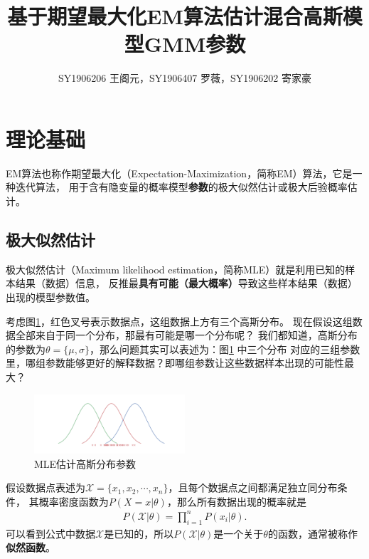 \documentclass[UTF8]{ctexart}
\begin{document}
\title{基于期望最大化EM算法估计混合高斯模型GMM参数}
\author{SY1906206 王阁元，SY1906407 罗薇，SY1906202 寄家豪}
\maketitle

\section{理论基础}

EM算法也称作期望最大化（Expectation-Maximization，简称EM）算法，它是一种迭代算法，
用于含有隐变量的概率模型\textbf{参数}的极大似然估计或极大后验概率估计。

\subsection{极大似然估计}
\label{subsection-1}

极大似然估计（Maximum likelihood estimation，简称MLE）就是利用已知的样本结果（数据）信息，
反推最\textbf{具有可能（最大概率）}导致这些样本结果（数据）出现的模型参数值。

考虑图\ref{MLE}，红色叉号表示数据点，这组数据上方有三个高斯分布。
现在假设这组数据全部来自于同一个分布，那最有可能是哪一个分布呢？
我们都知道，高斯分布的参数为$\theta=\{\mu, \sigma\}$，那么问题其实可以表述为：图\ref{MLE} 中三个分布
对应的三组参数里，哪组参数能够更好的解释数据？即哪组参数让这些数据样本出现的可能性最大？

\begin{figure}[!h]
  \includegraphics[width=0.5\textwidth]{./figures/MLE.pdf}
  \centering
  \caption{MLE估计高斯分布参数}
  \label{MLE}
\end{figure}

假设数据点表述为$\mathcal{X}=\{x_1, x_2, \cdots, x_n\}$，且每个数据点之间都满足独立同分布条件，
其概率密度函数为$P(X=x|\theta)$，那么所有数据出现的概率就是
\begin{equation}\label{Likelihood}
  \begin{split}
    P(\mathcal{X}|\theta) = \prod_{i=1}^{n}P(x_i|\theta).
  \end{split}
\end{equation}
可以看到公式中数据$\mathcal{X}$是已知的，所以$P(\mathcal{X}|\theta)$是一个关于$\theta$的函数，通常被称作\textbf{似然函数}。
\end{document}
